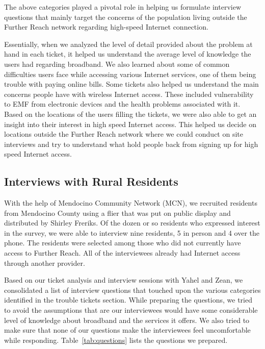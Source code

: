The above categories played a pivotal role in helping us formulate interview questions that mainly target the concerns of the population living outside the Further Reach network regarding high-speed Internet connection.

Essentially, when we analyzed the level of detail provided about the problem
at hand in each ticket, it helped us understand the average level of knowledge
the users had regarding broadband. We also learned about some of common
difficulties users face while accessing various Internet services, one of them
being trouble with paying online bills. Some tickets also helped us understand
the main concerns people have with wireless Internet access. These included
vulnerability to EMF from electronic devices and the health problems
associated with it. Based on the locations of the users filling the tickets,
we were also able to get an insight into their interest in high speed Internet
access. This helped us decide on locations outside the Further Reach network
where we could conduct on site interviews and try to understand what hold
people back from signing up for high speed Internet access.

\subsection{Interviews with Rural Residents}
\label{sec:interv-with-rural}

With the help of Mendocino Community Network (MCN), we recruited
residents from Mendocino County using a flier that was put on public display
and distributed by Shirley Freriks.
Of the dozen or so residents who expressed interest in the survey, we were able to interview
nine residents, 5 in person and 4 over the phone. The residents were selected among those
who did not currently have access to Further Reach. All of the interviewees
already had Internet access through another provider.

Based on our ticket analysis and interview sessions with Yahel and Zean, we consolidated a list of interview
questions that touched upon the various categories identified in the trouble tickets section. While preparing
the questions, we tried to avoid the assumptions that are our interviewees would have some considerable level
of knowledge about broadband and the services it offers. We also tried to make sure that none of our questions
make the interviewees feel uncomfortable while responding. Table~\ref{tab:questions} lists the questions
we prepared.

